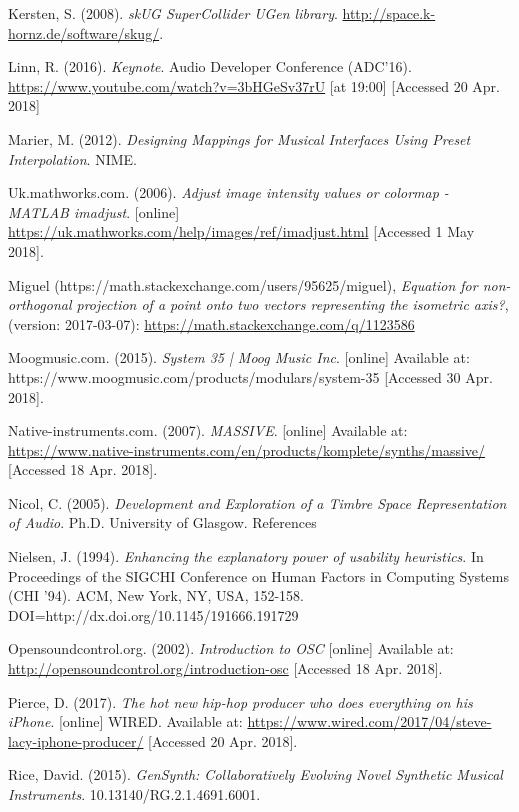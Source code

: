 \documentclass[11pt, oneside]{report}   	%
\begin{document}
{\begin{thebibliography}{9}
Kersten, S. (2008). \emph{skUG SuperCollider UGen library}. \url{http://space.k- hornz.de/software/skug/}.

Linn, R. (2016). \emph{Keynote}.  Audio Developer Conference (ADC'16). \url{https://www.youtube.com/watch?v=3bHGeSv37rU} [at 19:00] [Accessed 20 Apr. 2018]

Marier, M. (2012). \emph{Designing Mappings for Musical Interfaces Using Preset Interpolation}. NIME.

Uk.mathworks.com. (2006). \emph{Adjust image intensity values or colormap - MATLAB imadjust}. [online] \url{https://uk.mathworks.com/help/images/ref/imadjust.html} [Accessed 1 May 2018].

Miguel (https://math.stackexchange.com/users/95625/miguel), \emph{Equation for non-orthogonal projection of a point onto two vectors representing the isometric axis?}, (version: 2017-03-07): \url{https://math.stackexchange.com/q/1123586}

Moogmusic.com. (2015). \emph{System 35 | Moog Music Inc}. [online] Available at: https://www.moogmusic.com/products/modulars/system-35 [Accessed 30 Apr. 2018].

Native-instruments.com. (2007). \emph{MASSIVE}. [online] Available at: \url{https://www.native-instruments.com/en/products/komplete/synths/massive/} [Accessed 18 Apr. 2018].

Nicol, C. (2005). \emph{Development and Exploration of a Timbre Space Representation of Audio}. Ph.D. University of Glasgow.
References

Nielsen, J. (1994). \emph{Enhancing the explanatory power of usability heuristics}. In Proceedings of the SIGCHI Conference on Human Factors in Computing Systems (CHI '94). ACM, New York, NY, USA, 152-158. DOI=http://dx.doi.org/10.1145/191666.191729

Opensoundcontrol.org. (2002). \emph{Introduction to OSC} [online] Available at: \url{http://opensoundcontrol.org/introduction-osc} [Accessed 18 Apr. 2018].

Pierce, D. (2017). \emph{The hot new hip-hop producer who does everything on his iPhone}. [online] WIRED. Available at: \url{https://www.wired.com/2017/04/steve-lacy-iphone-producer/} [Accessed 20 Apr. 2018].

Rice, David. (2015). \emph{GenSynth: Collaboratively Evolving Novel Synthetic Musical Instruments}. 10.13140/RG.2.1.4691.6001. 


\end{thebibliography}}
\end{document}
